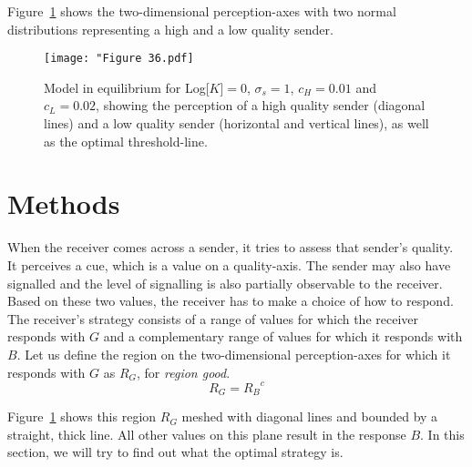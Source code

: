 \documentclass[a4paper,12pt]{article}
\numberwithin{equation}{section}
\begin{document}
\newpage

Figure~\ref{fig:Figure 36.pdf} shows the two-dimensional perception-axes with two normal distributions representing a high and a low quality sender.

\begin{figure}[h]
\captionsetup{width=350pt}
\begin{center}
\leavevmode
\texttt{[image: "Figure 36.pdf]}
\caption{Model in equilibrium for Log[$K$]$=0$, $\sigma_{s}=1$, $c_{H}=0.01$ and $c_{L}=0.02$, showing the perception of a high quality sender (diagonal lines) and a low quality sender (horizontal and vertical lines), as well as the optimal threshold-line.}
\label{fig:Figure 36.pdf}
\end{center}
\end{figure}

\newpage


\section{Methods}
\label{sec:Methods}

When the receiver comes across a sender, it tries to assess that sender's quality. It perceives a cue, which is a value on a quality-axis. The sender may also have signalled and the level of signalling is also partially observable to the receiver. Based on these two values, the receiver has to make a choice of how to respond. The receiver's strategy consists of a range of values for which the receiver responds with $G$ and a complementary range of values for which it responds with $B$. Let us define the region on the two-dimensional perception-axes for which it responds with $G$ as $R_{G}$, for \textit{region good}.
\begin{equation}
\label{eq:CueDetectionModel/RegionG}
R_{G} = {R_{B}}^{c}
\end{equation}

Figure~\ref{fig:Figure 36.pdf} shows this region $R_{G}$ meshed with diagonal lines and bounded by a straight, thick line. All other values on this plane result in the response $B$. In this section, we will try to find out what the optimal strategy is.
\end{document}
